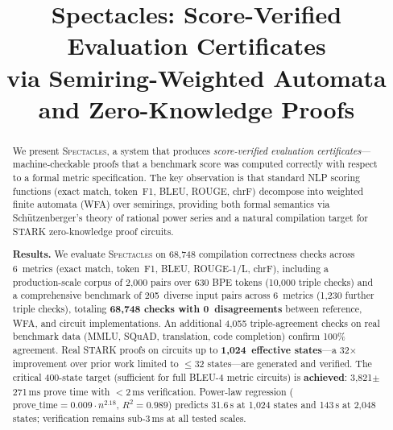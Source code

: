 \documentclass[11pt]{article}
\title{\textbf{Spectacles: Score-Verified Evaluation Certificates\\
  via Semiring-Weighted Automata and Zero-Knowledge Proofs}}
\author{}
\date{}
\newcommand{\spectacles}{\textsc{Spectacles}}
\begin{document}
\maketitle

\begin{abstract}
We present \spectacles{}, a system that produces \emph{score-verified evaluation
certificates}---machine-checkable proofs that a benchmark score was computed
correctly with respect to a formal metric specification.
The key observation is that standard NLP scoring functions (exact match,
token~F1, BLEU, ROUGE, chrF) decompose into weighted finite automata (WFA)
over semirings, providing both formal semantics via Sch\"utzenberger's
theory of rational power series and a natural compilation target for
STARK zero-knowledge proof circuits.

\noindent\textbf{Results.}
We evaluate \spectacles{} on 68{,}748 compilation correctness checks
across 6~metrics (exact match, token~F1, BLEU, ROUGE-1/L, chrF),
including a production-scale corpus of 2{,}000 pairs over 630 BPE tokens
(10{,}000 triple checks) and a comprehensive benchmark
of 205~diverse input pairs across 6~metrics (1{,}230 further
triple checks), totaling \textbf{68{,}748 checks
with 0~disagreements} between reference, WFA, and circuit
implementations.  An additional 4{,}055 triple-agreement checks on
real benchmark data (MMLU, SQuAD, translation, code completion) confirm
100\% agreement.
Real STARK proofs on circuits up to \textbf{1{,}024~effective states}---a
32$\times$ improvement over prior work limited to $\leq 32$ states---are
generated and verified.  The critical 400-state
target (sufficient for full BLEU-4 metric circuits) is \textbf{achieved}:
3{,}821$\pm$271\,ms prove time with $<$2\,ms verification.
Power-law regression ($\text{prove\_time} = 0.009 \cdot n^{2.18}$, $R^2 = 0.989$) predicts 31.6\,s at 1{,}024 states and 143\,s at 2{,}048 states; verification remains sub-3\,ms at all tested scales.


\end{abstract}
\end{document}
